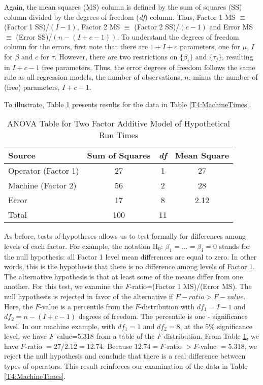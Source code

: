Again, the mean squares (MS) column is defined by the sum of squares
(SS) column divided by the degrees of freedom (\textit{df}) column.
Thus, Factor 1 MS $\equiv $ (Factor 1 SS)/$(I-1)$, Factor 2 MS
$\equiv $ (Factor 2 SS)/$(c-1)$ and Error MS $\equiv $ (Error
SS)/$(n-(I+c-1))$. To understand the degrees of freedom column for
the errors, first note that there are $1+I+c$ parameters, one for
$\mu $, $I$ for $\beta $ and $c$ for $\tau $. However, there are two
restrictions on $\{\beta _{i}\}$ and $\{\tau _{j}\}$, resulting in
$I+c-1$ free parameters. Thus, the error degrees of freedom follows
the same rule as all regression models, the number of observations,
$n$, minus the number of (free) parameters, $I+c-1$.

To illustrate, Table \ref{T4:ANOVATwoFactor} presents results for
the data in Table \ref{T4:MachineTimes}.

  \begin{center}  \begin{table}[h]
\caption{\label{T4:ANOVATwoFactor} ANOVA Table for Two Factor
Additive Model of Hypothetical Run Times}

\begin{tabular}{lccc}
\hline Source & Sum of Squares & \textit{df} & Mean Square \\
\hline Operator (Factor 1) & 27  & 1  & 27 \\
Machine (Factor 2)         & 56  & 2  & 28 \\
Error                      & 17  & 8  & 2.12 \\
Total                      & 100 & 11 &  \\ \hline
\end{tabular}

\end{table}  \end{center}  

As before, tests of hypotheses allows us to test formally for
differences among levels of each factor. For example, the notation
H$_{0}$: $\beta _{1}=\ldots =\beta _{I}=0$ stands for the null
hypothesis: all Factor 1 level mean differences are equal to zero.
In other words, this is the hypothesis that there is no difference
among levels of Factor 1. The alternative hypothesis is that at
least some of the means differ from one another. For this test, we
examine the \textit{F}-ratio=(Factor 1 MS)/(Error MS). The null
hypothesis is rejected in favor of the alternative if
$F-ratio>F-value. $ Here, the $F$-value is a percentile from the
$F$-distribution with $df_{1}=I-1$ and $df_{2}=n-(I+c-1)$ degrees of
freedom. The percentile is one - significance level. In our machine
example, with $df_{1}=1$ and $df_{2}=8$, at the 5\% significance
level, we have \textit{F}-value=5.318 from a table of the
$F$-distribution. From Table \ref{T4:ANOVATwoFactor}, we have
$\mathit{F}$-ratio $=27/2.12=12.74$. Because $12.74=F$-ratio
$>F$-value $=5.318$, we reject the null hypothesis and conclude that
there is a real difference between types of operators. This result
reinforces our examination of the data in Table
\ref{T4:MachineTimes}.

